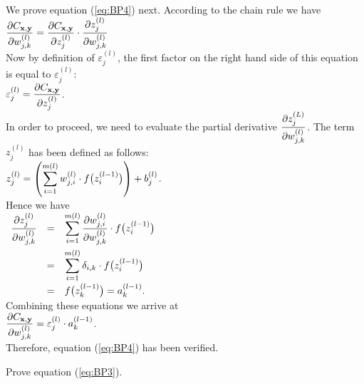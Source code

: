 We prove equation (\ref{eq:BP4}) next.  
According to the chain rule we have
\\[0.2cm]
\hspace*{1.3cm}
$ \displaystyle\frac{\partial C_{\mathbf{x}, \mathbf{y}}}{\partial w_{j,k}^{(l)}}  =  
  \frac{\partial C_{\mathbf{x}, \mathbf{y}}}{\partial z_j^{(l)}} \cdot \frac{\partial z_j^{(l)}}{\partial w_{j,k}^{(l)}} 
$ 
\\[0.2cm]
Now by definition of $\varepsilon_j^{(l)}$, the first factor on the right hand side of this equation is equal to $\varepsilon_j^{(l)}$: 
\\[0.2cm]
\hspace*{1.3cm}
$\displaystyle \varepsilon_j^{(l)} = \frac{\partial C_{\mathbf{x}, \mathbf{y}}}{\partial z_j^{(l)}}$.
\\[0.0cm]
In order to proceed, we need to evaluate the partial derivative
$\displaystyle\frac{\partial z_j^{(L)}}{\partial w_{j,k}^{(l)}}$.  The term $z_j^{(l)}$ has been defined as follows:
\\[0.2cm]
\hspace*{1.3cm}
$\displaystyle z_j^{(l)} = \left(\sum\limits_{i=1}^{m(l)} w_{j,i}^{(l)} \cdot f\bigl(z_i^{(l-1)}\bigr)\right) + b_j^{(l)}$.
\\[0.2cm]
Hence we have
\\[0.2cm]
\hspace*{1.3cm}
$
\begin{array}[t]{lcl}
        \displaystyle\frac{\partial z_j^{(l)}}{\partial w_{j,k}^{(l)}}
  & = & \displaystyle\sum\limits_{i=1}^{m(l)} \frac{\partial w_{j,i}^{(l)}}{\partial w_{j,k}^{(l)}} \cdot f\bigl(z_i^{(l-1)}\bigr) \\[0.5cm]
  & = & \displaystyle\sum\limits_{i=1}^{m(l)} \delta_{i,k}\cdot f\bigl(z_i^{(l-1)}\bigr) \\[0.4cm]
  & = & f\bigl(z_k^{(l-1)}\bigr) = a_k^{(l-1)}.
\end{array}
$
\\[0.2cm]
Combining these equations we arrive at
\\[0.2cm]
\hspace*{1.3cm}
$ \displaystyle\frac{\partial C_{\mathbf{x}, \mathbf{y}}}{\partial w_{j,k}^{(l)}}  =  
  \varepsilon_j^{(l)} \cdot a_k^{(l-1)} 
$. 
\\[0.2cm]
Therefore, equation (\ref{eq:BP4}) has been verified.

\exercise
Prove equation (\ref{eq:BP3}).
\eoxs

